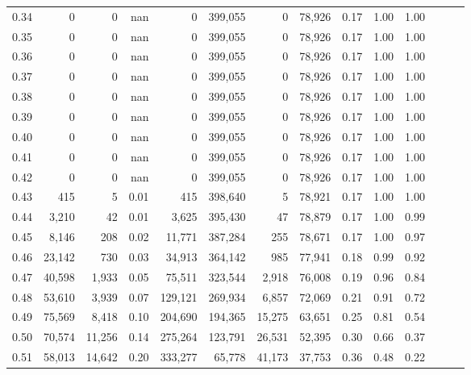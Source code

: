 \begin{tabular}{rrrrrrrrrrrrrr}
0.34 &       0 &       0 &   nan &        0 &  399,055 &       0 &  78,926 &  0.17 &  1.00 &      1.00 \\
0.35 &       0 &       0 &   nan &        0 &  399,055 &       0 &  78,926 &  0.17 &  1.00 &      1.00 \\
0.36 &       0 &       0 &   nan &        0 &  399,055 &       0 &  78,926 &  0.17 &  1.00 &      1.00 \\
0.37 &       0 &       0 &   nan &        0 &  399,055 &       0 &  78,926 &  0.17 &  1.00 &      1.00 \\
0.38 &       0 &       0 &   nan &        0 &  399,055 &       0 &  78,926 &  0.17 &  1.00 &      1.00 \\
0.39 &       0 &       0 &   nan &        0 &  399,055 &       0 &  78,926 &  0.17 &  1.00 &      1.00 \\
0.40 &       0 &       0 &   nan &        0 &  399,055 &       0 &  78,926 &  0.17 &  1.00 &      1.00 \\
0.41 &       0 &       0 &   nan &        0 &  399,055 &       0 &  78,926 &  0.17 &  1.00 &      1.00 \\
0.42 &       0 &       0 &   nan &        0 &  399,055 &       0 &  78,926 &  0.17 &  1.00 &      1.00 \\
0.43 &     415 &       5 &  0.01 &      415 &  398,640 &       5 &  78,921 &  0.17 &  1.00 &      1.00 \\
0.44 &   3,210 &      42 &  0.01 &    3,625 &  395,430 &      47 &  78,879 &  0.17 &  1.00 &      0.99 \\
0.45 &   8,146 &     208 &  0.02 &   11,771 &  387,284 &     255 &  78,671 &  0.17 &  1.00 &      0.97 \\
0.46 &  23,142 &     730 &  0.03 &   34,913 &  364,142 &     985 &  77,941 &  0.18 &  0.99 &      0.92 \\
0.47 &  40,598 &   1,933 &  0.05 &   75,511 &  323,544 &   2,918 &  76,008 &  0.19 &  0.96 &      0.84 \\
0.48 &  53,610 &   3,939 &  0.07 &  129,121 &  269,934 &   6,857 &  72,069 &  0.21 &  0.91 &      0.72 \\
0.49 &  75,569 &   8,418 &  0.10 &  204,690 &  194,365 &  15,275 &  63,651 &  0.25 &  0.81 &      0.54 \\
0.50 &  70,574 &  11,256 &  0.14 &  275,264 &  123,791 &  26,531 &  52,395 &  0.30 &  0.66 &      0.37 \\
0.51 &  58,013 &  14,642 &  0.20 &  333,277 &   65,778 &  41,173 &  37,753 &  0.36 &  0.48 &      0.22 \\

\end{tabular}
